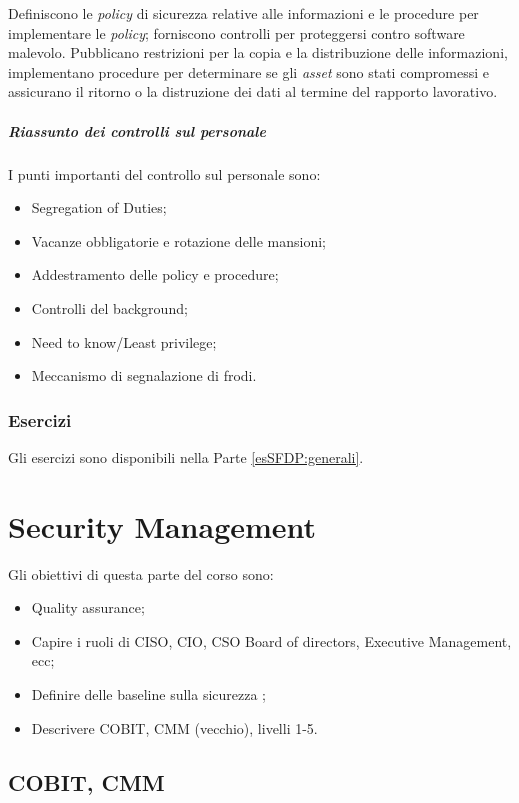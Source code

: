 Definiscono le \textit{policy} di sicurezza relative alle informazioni e le 
procedure per implementare le \textit{policy}; forniscono controlli per 
proteggersi contro software malevolo. Pubblicano restrizioni per la copia e la 
distribuzione delle informazioni, implementano procedure per determinare se 
gli \textit{asset} sono stati compromessi e assicurano il ritorno o la 
distruzione dei dati al termine del rapporto lavorativo.

\subsubsection{Riassunto dei controlli sul personale}

I punti importanti del controllo sul personale sono:
\begin{itemize}
\item Segregation of Duties;
\item Vacanze obbligatorie e rotazione delle mansioni;
\item Addestramento delle policy e procedure;
\item Controlli del background;
\item Need to know/Least privilege;
\item Meccanismo di segnalazione di frodi.
\end{itemize}

\section{Esercizi}

Gli esercizi sono disponibili nella Parte \ref{esSFDP:generali}.

\part{Security Management}
\label{SM}

Gli obiettivi di questa parte del corso sono:
\begin{itemize}
\item Quality assurance;
\item Capire i ruoli di CISO, CIO, CSO Board of directors, Executive
Management, ecc;
\item Definire delle baseline sulla sicurezza ;
\item Descrivere COBIT, CMM (vecchio), livelli 1-5.
\end{itemize}

\chapter{COBIT, CMM}

